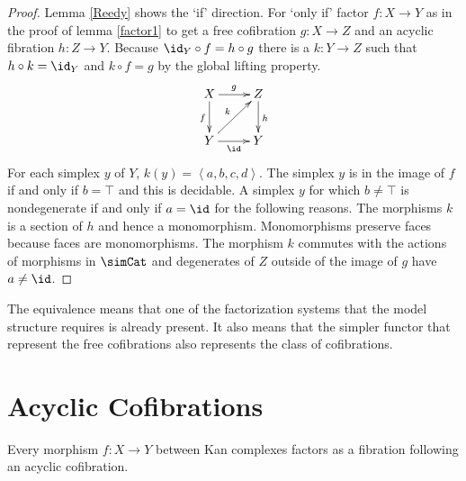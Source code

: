 \documentclass{tac}
\newcommand\of{:}
\newcommand\tuplet[1]{\left\langle #1 \right\rangle}
\begin{document}
\begin{proof} Lemma \ref{Reedy} shows the `if' direction. For `only if' factor $f\of X\to Y$ as in the proof of lemma \ref{factor1} to get a free cofibration $g\of X\to Z$ and an acyclic fibration $h\of Z\to Y$. Because $\id_Y\circ f = h\circ g$ there is a $k\of Y\to Z$ such that $h\circ k = \id_Y$ and $k\circ f = g$ by the global lifting property. 
\[
\xymatrix{
X\ar[d]_f \ar[r]^g & Z\ar[d]^h\\
Y\ar[r]_\id \ar[ur]^k & Y
}
\]
For each simplex $y$ of $Y$, $k(y)=\tuplet{a,b,c,d}$. The simplex $y$ is in the image of $f$ if and only if $b=\top$ and this is decidable. A simplex $y$ for which $b\neq \top$ is nondegenerate if and only if $a=\id$ for the following reasons. The morphisms $k$ is a section of $h$ and hence a monomorphism. Monomorphisms preserve faces because faces are monomorphisms. The morphism $k$ commutes with the actions of morphisms in $\simCat$ and degenerates of $Z$ outside of the image of $g$ have $a\neq\id$.
\end{proof}

The equivalence means that one of the factorization systems that the model structure requires is already present. It also means that the simpler functor that represent the free cofibrations also represents the class of cofibrations.

\section{Acyclic Cofibrations}


\begin{proposition} Every morphism $f\of X\to Y$ between Kan complexes factors as a fibration following an acyclic cofibration. \label{factor2} \end{proposition}
\end{document}
